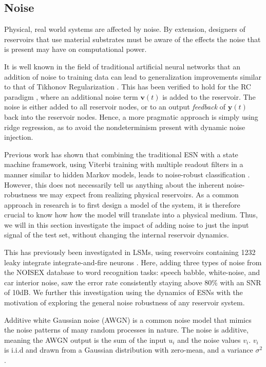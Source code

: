 \subsection{Noise}

Physical, real world systems are affected by noise. By extension, designers of
reservoirs that use material substrates must be aware of the effects the noise
that is present may have on computational power.

It is well known in the field of traditional artificial neural networks that an
addition of noise to training data can lead to generalization improvements
similar to that of Tikhonov Regularization \cite{bishop_training_1995}. This has
been verified to hold for the RC paradigm \cite{jaeger_echo_2001,
kurkova_stable_2008}, where an additional noise term $\mathbf{v}(t)$ is added to
the reservoir. The noise is either added to all reservoir nodes, or to an output
\textit{feedback} of $\mathbf{y}(t)$ back into the reservoir nodes. Hence, a
more pragmatic approach is simply using ridge regression, as to avoid the
nondeterminism present with dynamic noise injection.

Previous work has shown that combining the traditional ESN with a state machine
framework, using Viterbi training with multiple readout filters in a manner
similar to hidden Markov models, leads to noise-robust classification
\cite{skowronski_noise-robust_2007}. However, this does not necessarily tell us
anything about the inherent noise-robustness we may expect from realizing
physical reservoirs. As a common approach in research is to first design a model
of the system, it is therefore crucial to know how how the model will translate
into a physical medium. Thus, we will in this section investigate the impact of
adding noise to just the input signal of the test set, without changing the
internal reservoir dynamics.

This has previously been investigated in LSMs, using reservoirs containing 1232
leaky integrate integrate-and-fire neurons
\cite{verstraeten_isolated_2005}. Here, adding three types of noise from the
NOISEX database to word recognition tasks: speech babble, white-noise, and car
interior noise, saw the error rate consistently staying above 80\% with an SNR
of 10dB. We further this investigation using the dynamics of ESNs with the
motivation of exploring the general noise robustness of any reservoir system.


Additive white Gaussian noise (AWGN) is a common noise model that mimics the
noise patterns of many random processes in nature. The noise is additive,
meaning the AWGN output is the sum of the input $u_{i}$ and the noise values
$v_{i}$. $v_{i}$ is i.i.d and drawn from a Gaussian distribution with zero-mean,
and a variance $\sigma^{2}$.


